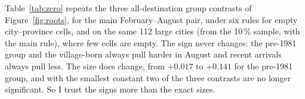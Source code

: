 



Table~\ref{tab:zero} repeats the three all-destination group contrasts of Figure~\ref{fig:roots}, for the main February--August pair, under six rules for empty city--province cells, and on the same 112 large cities (from the 10\,\% sample, with the main rule), where few cells are empty. The sign never changes: the pre-1981 group and the village-born always pull harder in August and recent arrivals always pull less. The size does change, from $+0.017$ to $+0.141$ for the pre-1981 group, and with the smallest constant two of the three contrasts are no longer significant. So I trust the signs more than the exact sizes.
